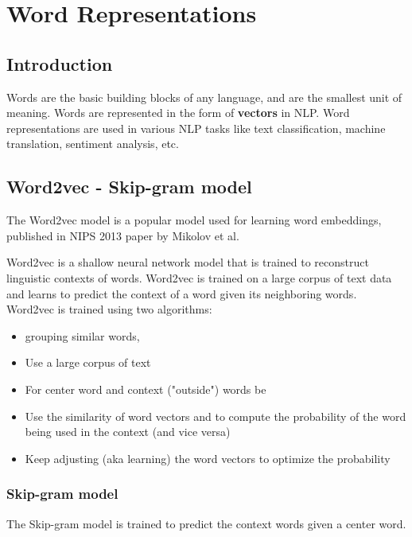 \chapter{Word Representations}

\section{Introduction}

Words are the basic building blocks of any language, and are the smallest unit of meaning. Words are represented in the form of {\bf vectors} in NLP. Word representations are used in various NLP tasks like text classification, machine translation, sentiment analysis, etc.

\section{Word2vec - Skip-gram model}
The Word2vec model is a popular model used for learning word embeddings, published in NIPS 2013 paper by Mikolov et al.\cite{mikolov2013efficientestimationwordrepresentations} \cite{NIPS2013_9aa42b31}

Word2vec is a shallow neural network model that is trained to reconstruct linguistic contexts of words. Word2vec is trained on a large corpus of text data and learns to predict the context of a word given its neighboring words. Word2vec is trained using two algorithms:

\begin{itemize}
    \item grouping similar words,
    \item Use a large corpus of text 
    \item For center word  and context ("outside") words be  
    \item Use the similarity of word vectors  and  to compute the probability of the word being used in the context (and vice versa)  
    \item Keep adjusting (aka learning) the word vectors to optimize the probability
\end{itemize}

\subsection{Skip-gram model}

The Skip-gram model is trained to predict the context words given a center word. \\

